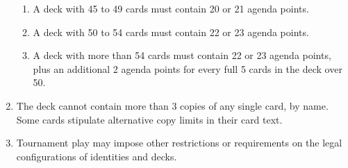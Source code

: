 \begin{enumerate}
\begin{enumerate}
		      \item A deck with 45 to 49 cards must contain 20 or 21 agenda points.
		      \item A deck with 50 to 54 cards must contain 22 or 23 agenda points.
		      \item A deck with more than 54 cards must contain 22 or 23 agenda points, plus an additional 2 agenda points for every full 5 cards in the deck over 50.\\[10pt]
	      \end{enumerate}
	\item The deck cannot contain more than 3 copies of any single card, by name. Some cards stipulate alternative copy limits in their card text.
	\item Tournament play may impose other restrictions or requirements on the legal configurations of identities and decks.
\end{enumerate}

